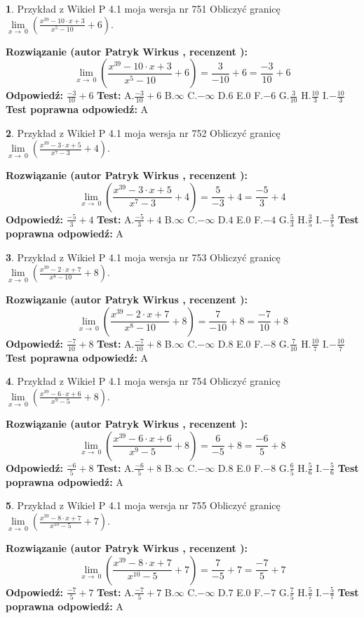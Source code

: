 \documentclass[12pt, a4paper]{article}
\theoremstyle{definition} %
\newtheorem{zad}{}
\newcommand{\zadStart}[1]{\begin{zad}#1\newline}
\newcommand{\zadStop}{\end{zad}}
\newcommand{\rozwStart}[2]{\noindent \textbf{Rozwiązanie (autor #1 , recenzent #2): }\newline}
\newcommand{\rozwStop}{\newline}
\newcommand{\odpStart}{\noindent \textbf{Odpowiedź:}\newline}
\newcommand{\odpStop}{\newline}
\newcommand{\testStart}{\noindent \textbf{Test:}\newline}
\newcommand{\testStop}{\newline}
\newcommand{\kluczStart}{\noindent \textbf{Test poprawna odpowiedź:}\newline}
\newcommand{\kluczStop}{\newline}
\begin{document}
\zadStart{Przykład z Wikieł P 4.1 moja wersja nr 751}
Obliczyć granicę $\lim\limits_{x\to\ 0}(\frac{x^{39}-10 \cdot x +3}{x^{5}-10}+6)$.
\zadStop
\rozwStart{Patryk Wirkus}{}
$$\lim\limits_{x\to\ 0}(\frac{x^{39}-10 \cdot x +3}{x^{5}-10}+6)=\frac{3}{-10}+6=\frac{-3}{10}+6$$
\rozwStop
\odpStart
$\frac{-3}{10}+6$
\odpStop
\testStart
A.$\frac{-3}{10}+6$
B.$\infty$
C.$-\infty$
D.$6$
E.$0$
F.$-6$
G.$\frac{3}{10}$
H.$\frac{10}{3}$
I.$-\frac{10}{3}$
\testStop
\kluczStart
A
\kluczStop



\zadStart{Przykład z Wikieł P 4.1 moja wersja nr 752}
Obliczyć granicę $\lim\limits_{x\to\ 0}(\frac{x^{39}-3 \cdot x +5}{x^{7}-3}+4)$.
\zadStop
\rozwStart{Patryk Wirkus}{}
$$\lim\limits_{x\to\ 0}(\frac{x^{39}-3 \cdot x +5}{x^{7}-3}+4)=\frac{5}{-3}+4=\frac{-5}{3}+4$$
\rozwStop
\odpStart
$\frac{-5}{3}+4$
\odpStop
\testStart
A.$\frac{-5}{3}+4$
B.$\infty$
C.$-\infty$
D.$4$
E.$0$
F.$-4$
G.$\frac{5}{3}$
H.$\frac{3}{5}$
I.$-\frac{3}{5}$
\testStop
\kluczStart
A
\kluczStop



\zadStart{Przykład z Wikieł P 4.1 moja wersja nr 753}
Obliczyć granicę $\lim\limits_{x\to\ 0}(\frac{x^{39}-2 \cdot x +7}{x^{8}-10}+8)$.
\zadStop
\rozwStart{Patryk Wirkus}{}
$$\lim\limits_{x\to\ 0}(\frac{x^{39}-2 \cdot x +7}{x^{8}-10}+8)=\frac{7}{-10}+8=\frac{-7}{10}+8$$
\rozwStop
\odpStart
$\frac{-7}{10}+8$
\odpStop
\testStart
A.$\frac{-7}{10}+8$
B.$\infty$
C.$-\infty$
D.$8$
E.$0$
F.$-8$
G.$\frac{7}{10}$
H.$\frac{10}{7}$
I.$-\frac{10}{7}$
\testStop
\kluczStart
A
\kluczStop



\zadStart{Przykład z Wikieł P 4.1 moja wersja nr 754}
Obliczyć granicę $\lim\limits_{x\to\ 0}(\frac{x^{39}-6 \cdot x +6}{x^{9}-5}+8)$.
\zadStop
\rozwStart{Patryk Wirkus}{}
$$\lim\limits_{x\to\ 0}(\frac{x^{39}-6 \cdot x +6}{x^{9}-5}+8)=\frac{6}{-5}+8=\frac{-6}{5}+8$$
\rozwStop
\odpStart
$\frac{-6}{5}+8$
\odpStop
\testStart
A.$\frac{-6}{5}+8$
B.$\infty$
C.$-\infty$
D.$8$
E.$0$
F.$-8$
G.$\frac{6}{5}$
H.$\frac{5}{6}$
I.$-\frac{5}{6}$
\testStop
\kluczStart
A
\kluczStop



\zadStart{Przykład z Wikieł P 4.1 moja wersja nr 755}
Obliczyć granicę $\lim\limits_{x\to\ 0}(\frac{x^{39}-8 \cdot x +7}{x^{10}-5}+7)$.
\zadStop
\rozwStart{Patryk Wirkus}{}
$$\lim\limits_{x\to\ 0}(\frac{x^{39}-8 \cdot x +7}{x^{10}-5}+7)=\frac{7}{-5}+7=\frac{-7}{5}+7$$
\rozwStop
\odpStart
$\frac{-7}{5}+7$
\odpStop
\testStart
A.$\frac{-7}{5}+7$
B.$\infty$
C.$-\infty$
D.$7$
E.$0$
F.$-7$
G.$\frac{7}{5}$
H.$\frac{5}{7}$
I.$-\frac{5}{7}$
\testStop
\kluczStart
A
\kluczStop
\end{document}
